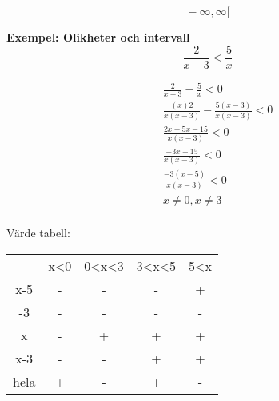 \begin{equation}
[ \, a, \infty [ \,
\end{equation}
\begin{equation}
] \, -\infty, \infty [ \,
\end{equation}

\textbf{Exempel: Olikheter och intervall}
\begin{equation}
\frac { 2 } { x - 3 } < \frac { 5 } { x }
\end{equation}

\begin{align*}
&\quad \frac{ 2 }{ x - 3 } - \frac{ 5 }{ x } < 0 \\
&\quad \frac{(x) 2 }{x (x - 3)} - \frac{ 5 ( x - 3 )}{ x ( x - 3 ) } < 0 \\
&\quad \frac{ 2 x - 5 x - 15 }{ x ( x - 3 ) } < 0 \\
&\quad \frac{ - 3 x - 15 }{ x ( x - 3 ) } < 0 \\
&\quad \frac{ - 3 ( x - 5 ) }{ x ( x - 3 ) } < 0 \\
&\quad  x \neq 0 , x \neq 3 \\
\end{align*}

Värde tabell:
\begin{center}
\begin{tabular}{ |c|c|c|c|c| } 
 \hline
        & x<0   & 0<x<3 & 3<x<5 & 5<x   \\ 
 x-5    & -     & -     & -     & +     \\ 
 -3     & -     & -     & -     & -     \\  
 x      & -     & +     & +     & +     \\ 
 x-3    & -     & -     & +     & +     \\ 
 hela   & +     & -     & +     & -     \\ 
 \hline
\end{tabular}
\end{center}


\newpage

